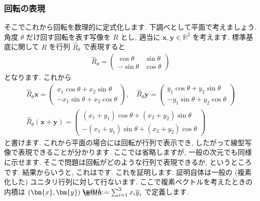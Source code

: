 \documentclass[openany, a4paper, oneside]{jsbook}
\makeatletter
\newcommand*{\defeq}{\mathrel{\rlap{%
\raisebox{0.3ex}{$\m@th\cdot$}}%
\raisebox{-0.3ex}{$\m@th\cdot$}}%
=}
\theoremstyle{break}
\theoremstyle{breakdefn}
\newcommand{\bbR}{\mathbb{R}}
\makeatother
\begin{document}
\subsubsection{回転の表現}


そこでこれから回転を数理的に定式化します.
下調べとして平面で考えましょう.
角度 $\theta$ だけ回す回転を表す写像を $R$ とし, 適当に $\bm{x} , \bm{y} \in \bbR^2$ を考えます.
標準基底に関して $R$ を行列 $\hat{R}_{\theta}$ で表現すると
    \begin{align}
        \hat{R} _{ \theta }
        =
        \begin{pmatrix}
            \cos \theta & \sin \theta \\
            -\sin \theta & \cos \theta
        \end{pmatrix}
    \end{align}
となります.
これから
    \begin{gather}
        \hat{R} _{ \theta } \bm{x}
        =
        \begin{pmatrix}
            x_1 \cos \theta + x_2 \sin \theta \\
            -x_1 \sin \theta + x_2 \cos \theta
        \end{pmatrix}
        , \quad
        \hat{R} _{ \theta } \bm{y}
        =
        \begin{pmatrix}
            y_1 \cos \theta + y_2 \sin \theta \\
            -y_1 \sin \theta + y_2 \cos \theta
        \end{pmatrix} \\
        \hat{R} _{ \theta } ( \bm{x} + \bm{y} )
        =
        \begin{pmatrix}
            ( x_1 + y_1 ) \cos \theta + (x_2 + y_2) \sin \theta \\
            -( x_1 + y_1 ) \sin \theta + ( x_2 + y_2 ) \cos \theta
        \end{pmatrix}
    \end{gather}
と書けます.
これから平面の場合には回転が行列で表示でき, したがって線型写像で表現できることが分かります.
ここでは省略しますが, 一般の次元でも同様に示せます.
そこで問題は回転がどのような行列で表現できるか, というところです.
結果からいうと, これはです.
これを証明します.
証明自体は一般の (複素化した) ユニタリ行列に対して行ないます.
ここで複素ベクトルを考えたときの内積は $( \bm{x} , \bm{y} ) \defeq \sum_{i=1}^3 x_i \overline{y}_i$
で定義します.
\end{document}
